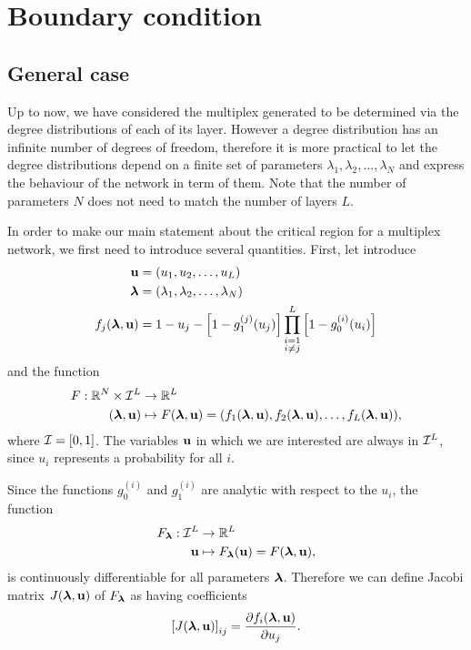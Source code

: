 \documentclass[
11pt, %
english, %
singlespacing, %
nolistspacing, %
liststotoc, %
headsepline, %
]{MastersDoctoralThesis} %
\begin{document}
\section{Boundary condition}


\subsection{General case}

Up to now, we have considered the multiplex generated to be determined via the degree distributions of each of its layer. However a degree distribution has an infinite number of degrees of freedom, therefore it is more practical to let the degree distributions depend on a finite set of parameters $\lambda_1, \lambda_2, \dots, \lambda_N$ and express the behaviour of the network in term of them. Note that the number of parameters $N$ does not need to match the number of layers $L$.

In order to make our main statement about the critical region for a multiplex network, we first need to introduce several quantities. First, let introduce
\begin{align}
	\boldsymbol{\mathrm{u}} &= (u_1, u_2, \dots, u_L) \\
	\boldsymbol{\mathrm{\lambda}} &= (\lambda_1, \lambda_2, \dots, \lambda_N) \\
	f_j(\boldsymbol{\mathrm{\lambda}}, \boldsymbol{\mathrm{u}}) &= 1 - u_j - \left[1 - g_1^{(j)}(u_j) \right] \prod_{\substack{i = 1 \\ i \neq j}}^{L}  \left[1 - g_0^{(i)}(u_i) \right] \label{Definition fj}
\end{align}
and the function
\begin{align}
	F : \mathbb{R}^N \times \mathcal{I}^L &\rightarrow \mathbb{R}^L \\
	(\boldsymbol{\mathrm{\lambda}}, \boldsymbol{\mathrm{u}}) &\mapsto F(\boldsymbol{\mathrm{\lambda}}, \boldsymbol{\mathrm{u}}) = (f_1(\boldsymbol{\mathrm{\lambda}}, \boldsymbol{\mathrm{u}}), f_2(\boldsymbol{\mathrm{\lambda}}, \boldsymbol{\mathrm{u}}), \dots, f_L(\boldsymbol{\mathrm{\lambda}}, \boldsymbol{\mathrm{u}})), \label{Definition F}
\end{align}
where $\mathcal{I} = [0, 1]$. The variables $\boldsymbol{\mathrm{u}}$ in which we are interested are always in $\mathcal{I}^L$, since $u_i$ represents a probability for all $i$.

Since the functions $g_0^{(i)}$ and $g_1^{(i)}$ are analytic with respect to the $u_i$, the function
\begin{align}
	F_{\boldsymbol{\mathrm{\lambda}}} : \mathcal{I}^L &\rightarrow \mathbb{R}^L\\
		\boldsymbol{\mathrm{u}} &\mapsto F_{\boldsymbol{\mathrm{\lambda}}}(\boldsymbol{\mathrm{u}}) = F(\boldsymbol{\mathrm{\lambda}}, \boldsymbol{\mathrm{u}}),
\end{align}
is continuously differentiable for all parameters $\boldsymbol{\mathrm{\lambda}}$. Therefore we can define Jacobi matrix $J(\boldsymbol{\mathrm{\lambda}}, \boldsymbol{\mathrm{u}})$ of $F_{\boldsymbol{\mathrm{\lambda}}}$ as having coefficients
\begin{align}
	\left[ J(\boldsymbol{\mathrm{\lambda}}, \boldsymbol{\mathrm{u}}) \right]_{ij} = \frac{\partial f_i(\boldsymbol{\mathrm{\lambda}},\boldsymbol{\mathrm{u}})}{\partial u_j}.
\end{align}
\end{document}
